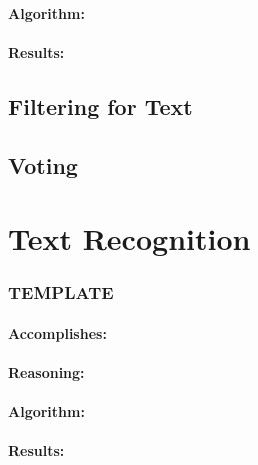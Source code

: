 \paragraph*{Algorithm:}\mbox{}\par

\paragraph*{Results:}\mbox{}\par

\subsection{Filtering for Text}

\subsection{Voting}

\section{Text Recognition}\label{sec:text-recognition}



\subsubsection{TEMPLATE}
\label{subsubsec:TEMPLATE}

\paragraph*{Accomplishes:}\mbox{}\par

\paragraph*{Reasoning:}\mbox{}\par

\paragraph*{Algorithm:}\mbox{}\par

\paragraph*{Results:}\mbox{}\par
